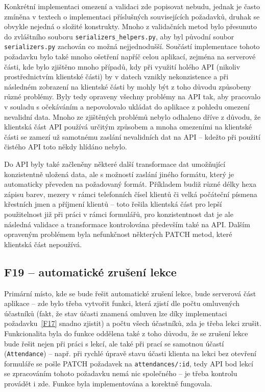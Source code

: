 Konkrétní implementaci omezení a validaci zde popisovat nebudu, jednak je často zmíněna v textech o implementaci příslušných souvisejících požadavků, druhak se obvykle nejedná o složité konstrukty. Mnoho z validačních metod bylo přesunuto do zvláštního souboru \verb|serializers_helpers.py|, aby byl původní soubor \verb|serializers.py| zachován co možná nejjednodušší. Součástí implementace tohoto požadavku bylo také mnoho ošetření napříč celou aplikací, zejména na serverové části, kde bylo zjištěno mnoho případů, kdy při využití holého API (nikoliv prostřednictvím klientské části) by v datech vznikly nekonzistence a při následném zobrazení na klientské části by mohly být z toho důvodu způsobeny různé problémy. Byly tedy opraveny všechny problémy na API tak, aby pracovalo v souladu s očekáváním a nepovolovalo ukládat do aplikace z pohledu omezení nevalidní data. Mnoho ze zjištěných problémů nebylo odhaleno dříve z důvodu, že klientská část API používá určitým způsobem a mnoha omezeními na klientské části se zamezí už samotnému zaslání nevalidních dat na API -- kdežto při použití čistého API toto někdy hlídáno nebylo.

Do API byly také začleněny některé další transformace dat umožňující konzistentně uložená data, ale s možností zaslání jiného formátu, který je automaticky převeden na požadovaný formát. Příkladem budiž různé délky hexa zápisu barev, mezery v rámci telefonních čísel klientů či velká počáteční písmena křestních jmen a příjmení klientů -- toto řešila klientská část pro lepší použitelnost již při práci v rámci formulářů, pro konzistentnost dat je ale následná validace a transformace kontrolována především také na API. Dalším opraveným problémem byla nefunkčnost některých PATCH metod, které klientská část nepoužívá.


\subsection{F19 -- automatické zrušení lekce}

Primární místo, kde se bude řešit automatické zrušení lekce, bude serverová část aplikace -- zde bylo třeba vytvořit funkci, která zjistí dle počtu omluvených účastníků (fakt, že stav účasti znamená omluven lze díky implementaci požadavku~\ref{F17} snadno zjistit) a počtu všech účastníků, zda je třeba lekci zrušit. Funkcionalita byla do funkce oddělena také z toho důvodu, že se zrušení lekce bude řešit nejen při práci s lekcí, ale také při prací se samotnou účastí (\verb|Attendance|) -- např. při rychlé úpravě stavu účasti klienta na lekci bez otevření formuláře se pošle PATCH požadavek na \verb|attendances/:id|, tedy API bod lekcí se zpracováním tohoto požadavku nemá nic společného -- je třeba kontrolu provádět i zde. Funkce byla implementována a korektně fungovala.

